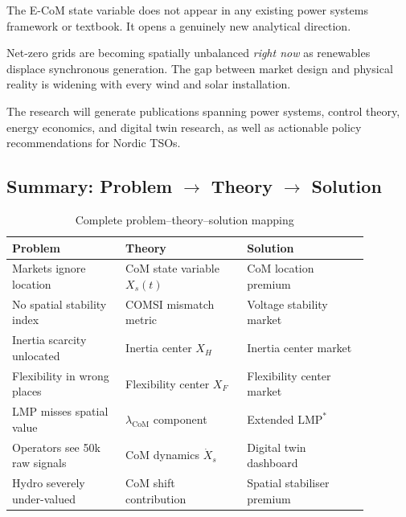 \documentclass[12pt, a4paper]{article}
\begin{document}
\begin{description}[leftmargin=2em]
  \item[Novel] The E-CoM state variable does not appear in any existing power
        systems framework or textbook. It opens a genuinely new analytical
        direction.
  \item[Timely] Net-zero grids are becoming spatially unbalanced \emph{right
        now} as renewables displace synchronous generation.
        The gap between market design and physical reality is widening with
        every wind and solar installation.
  \item[Impactful] The research will generate publications spanning power
        systems, control theory, energy economics, and digital twin research,
        as well as actionable policy recommendations for Nordic TSOs.
\end{description}

\subsection*{Summary: Problem $\to$ Theory $\to$ Solution}

\begin{table}[htbp]
  \centering
  \caption{Complete problem–theory–solution mapping}
  \label{tab:summary}
  \small
  \begin{tabular}{p{0.28\linewidth} p{0.30\linewidth} p{0.30\linewidth}}
    \toprule
    \textbf{Problem} & \textbf{Theory} & \textbf{Solution} \\
    \midrule
    Markets ignore location & CoM state variable $X_s(t)$ & CoM location premium \\
    No spatial stability index & COMSI mismatch metric & Voltage stability market \\
    Inertia scarcity unlocated & Inertia center $X_H$ & Inertia center market \\
    Flexibility in wrong places & Flexibility center $X_F$ & Flexibility center market \\
    LMP misses spatial value & $\lambda_{\mathrm{CoM}}$ component & Extended $\mathrm{LMP}^*$ \\
    Operators see 50k raw signals & CoM dynamics $\dot{X}_s$ & Digital twin dashboard \\
    Hydro severely under-valued & CoM shift contribution & Spatial stabiliser premium \\
    \bottomrule
  \end{tabular}
\end{table}



\end{document}
